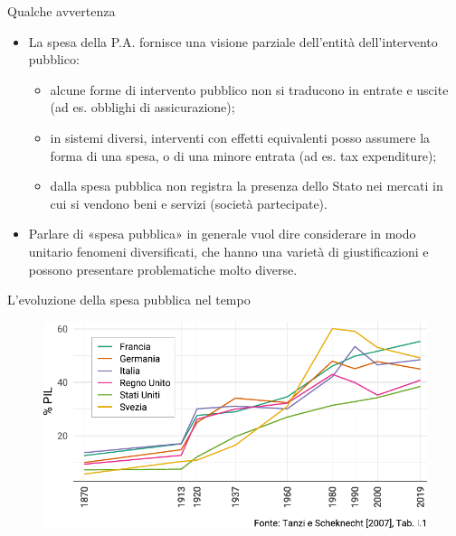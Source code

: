 \documentclass[aspectratio=64,12pt]{beamer}
\begin{document}
\begin{frame}{Qualche avvertenza}
\begin{itemize}
\item La spesa della P.A. fornisce una visione parziale dell’entità dell’intervento pubblico:
\begin{itemize}
\item alcune forme di intervento pubblico non si traducono in entrate e uscite (ad es. obblighi di assicurazione);
\item in sistemi diversi, interventi con effetti equivalenti posso assumere la forma di una spesa, o di una minore entrata (ad es. tax expenditure);
\item dalla spesa pubblica non registra la presenza dello Stato nei mercati in cui si vendono beni e servizi (società partecipate).
\end{itemize}
\item Parlare di «spesa pubblica» in generale vuol dire considerare in modo unitario fenomeni diversificati, che hanno una varietà di giustificazioni e possono presentare problematiche molto diverse.
\end{itemize}
\end{frame}

\begin{frame}{L'evoluzione della spesa pubblica nel tempo}
\begin{figure}
\centering
\includegraphics[width=\textwidth]{./figure/hist-government-expenditure-tanzi-scheknecht-color.pdf}
\end{figure}
\end{frame}
\end{document}
